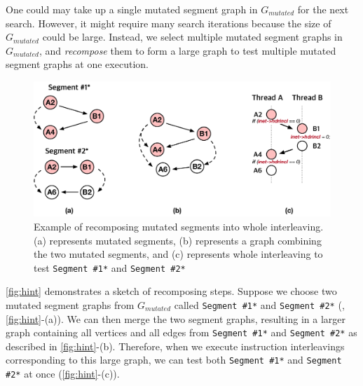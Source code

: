 %
One could may take up a single mutated segment graph in $G_{mutated}$ 
for the next search.
%
However, it might require many search iterations because the size of
$G_{mutated}$ could be large.
%
Instead, we select multiple mutated segment graphs in $G_{mutated}$,
and \textit{recompose} them to form a large graph to test multiple
mutated segment graphs at one execution. 


\begin{figure}[t]
  \centering
  \includegraphics[width=0.85\linewidth]{fig/hint.pdf}
  \caption{Example of recomposing mutated segments into whole
    interleaving. (a) represents mutated segments, (b) represents a
    graph combining the two mutated segments, and (c) represents whole
    interleaving to test \texttt{Segment \#1*} and \texttt{Segment
      \#2*}}
  \label{fig:hint}
\end{figure}


\autoref{fig:hint} demonstrates a sketch of recomposing steps. Suppose we
choose two mutated segment graphs from $G_{mutated}$ called
\texttt{Segment \#1*} and \texttt{Segment \#2*} (\ie,
\autoref{fig:hint}-(a)).
%
We can then merge the two segment graphs, resulting in a
larger graph containing all vertices and all edges from \texttt{Segment
  \#1*} and \texttt{Segment \#2*} as described in
\autoref{fig:hint}-(b).
%
%
%
%
%
Therefore, when we execute instruction interleavings corresponding to this
large graph, we can test both \texttt{Segment \#1*} and \texttt{Segment
  \#2*} at once (\autoref{fig:hint}-(c)).

